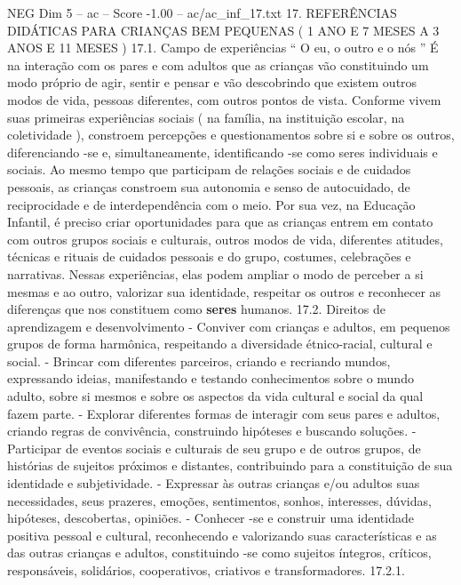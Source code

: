 \begin{textsample}{NEG Dim 5 – ac – Score -1.00 – ac/ac\_inf\_17.txt}  \label{ex:f5_neg_165}
17.
REFERÊNCIAS DIDÁTICAS PARA CRIANÇAS BEM PEQUENAS ( 1 ANO E 7 MESES A 3 ANOS E 11 MESES ) 17.1.
Campo de experiências “ O eu, o outro e o nós ” É na interação com os pares e com adultos que as crianças vão constituindo um modo próprio de agir, sentir e pensar e vão descobrindo que existem outros modos de vida, pessoas diferentes, com outros pontos de vista.
Conforme vivem suas primeiras experiências sociais ( na família, na instituição escolar, na coletividade ), constroem percepções e questionamentos sobre si e sobre os outros, diferenciando -se e, simultaneamente, identificando -se como seres individuais e sociais.
Ao mesmo tempo que participam de relações sociais e de cuidados pessoais, as crianças constroem sua autonomia e senso de autocuidado, de reciprocidade e de interdependência com o meio.
Por sua vez, na Educação Infantil, é preciso criar oportunidades para que as crianças entrem em contato com outros grupos sociais e culturais, outros modos de vida, diferentes atitudes, técnicas e rituais de cuidados pessoais e do grupo, costumes, celebrações e narrativas.
Nessas experiências, elas podem ampliar o modo de perceber a si mesmas e ao outro, valorizar sua identidade, respeitar os outros e reconhecer as diferenças que nos constituem como \textbf{seres} humanos. 17.2.
Direitos de aprendizagem e desenvolvimento - Conviver com crianças e adultos, em pequenos grupos de forma harmônica, respeitando a diversidade étnico-racial, cultural e social. - Brincar com diferentes parceiros, criando e recriando mundos, expressando ideias, manifestando e testando conhecimentos sobre o mundo adulto, sobre si mesmos e sobre os aspectos da vida cultural e social da qual fazem parte. - Explorar diferentes formas de interagir com seus pares e adultos, criando regras de convivência, construindo hipóteses e buscando soluções. - Participar de eventos sociais e culturais de seu grupo e de outros grupos, de histórias de sujeitos próximos e distantes, contribuindo para a constituição de sua identidade e subjetividade. - Expressar às outras crianças e/ou adultos suas necessidades, seus prazeres, emoções, sentimentos, sonhos, interesses, dúvidas, hipóteses, descobertas, opiniões. - Conhecer -se e construir uma identidade positiva pessoal e cultural, reconhecendo e valorizando suas características e as das outras crianças e adultos, constituindo -se como sujeitos íntegros, críticos, responsáveis, solidários, cooperativos, criativos e transformadores. 17.2.1.

\end{textsample}

